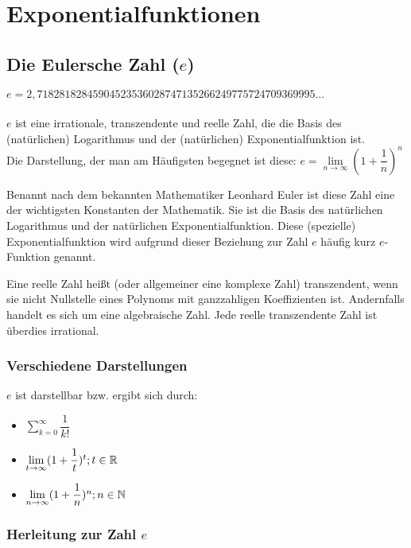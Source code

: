 \chapter{Exponentialfunktionen}

		\section{Die Eulersche Zahl ($e$)}

\begin{Definition}
$e = 2,71828182845904523536028747135266249775724709369995...$\\
\\
$e$ ist eine irrationale, transzendente und reelle Zahl, die die Basis des (natürlichen) Logarithmus und der (natürlichen) Exponentialfunktion ist.\\
Die Darstellung, der man am Häufigsten begegnet ist diese:
$e=\lim\limits_{n\to \infty}(1+\dfrac{1}{n})^n$
\end{Definition}
Benannt nach dem bekannten Mathematiker Leonhard Euler ist diese Zahl eine der wichtigsten Konstanten der Mathematik.
Sie ist die Basis des natürlichen Logarithmus und der natürlichen Exponentialfunktion. Diese (spezielle) Exponentialfunktion wird aufgrund dieser Beziehung zur Zahl $e$ häufig kurz $e$-Funktion genannt.
\begin{Definition}
  Eine reelle Zahl heißt (oder allgemeiner eine komplexe Zahl) transzendent,
  wenn sie nicht Nullstelle eines Polynoms mit ganzzahligen Koeffizienten ist.
  Andernfalls handelt es sich um eine algebraische Zahl. Jede reelle transzendente Zahl ist überdies irrational.
\end{Definition}

	\subsection{Verschiedene Darstellungen}

$e$ ist darstellbar bzw. ergibt sich durch:
\begin{itemize}
\item $\sum\limits_{k=0}^{\infty}\dfrac{1}{k!}$
\item $\lim\limits_{t\to \infty}(1+\dfrac{1}{t})^t;t\in\mathbb{R}$
\item $\lim\limits_{n\to \infty}(1+\dfrac{1}{n})^n;n\in\mathbb{N}$
\end{itemize}

	\subsection{Herleitung zur Zahl $e$}

